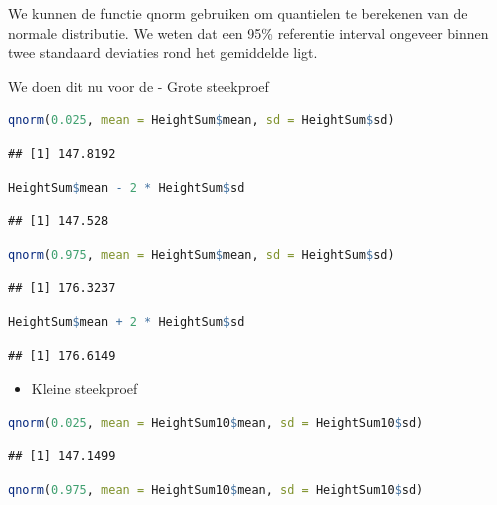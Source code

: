 \documentclass[
  12pt,dutch,coursenotes]{book}
\providecommand{\tightlist}{%
  \setlength{\itemsep}{0pt}\setlength{\parskip}{0pt}}
\theoremstyle{definition}
\theoremstyle{definition}
\theoremstyle{definition}
\theoremstyle{definition}
\theoremstyle{remark}
\begin{document}
We kunnen de functie qnorm gebruiken om quantielen te berekenen van de normale distributie. We weten dat een 95\% referentie interval ongeveer binnen twee standaard deviaties rond het gemiddelde ligt.

We doen dit nu voor de
- Grote steekproef

\begin{lstlisting}[language=R]
qnorm(0.025, mean = HeightSum$mean, sd = HeightSum$sd)
\end{lstlisting}

\begin{lstlisting}
## [1] 147.8192
\end{lstlisting}

\begin{lstlisting}[language=R]
HeightSum$mean - 2 * HeightSum$sd
\end{lstlisting}

\begin{lstlisting}
## [1] 147.528
\end{lstlisting}

\begin{lstlisting}[language=R]
qnorm(0.975, mean = HeightSum$mean, sd = HeightSum$sd)
\end{lstlisting}

\begin{lstlisting}
## [1] 176.3237
\end{lstlisting}

\begin{lstlisting}[language=R]
HeightSum$mean + 2 * HeightSum$sd
\end{lstlisting}

\begin{lstlisting}
## [1] 176.6149
\end{lstlisting}

\begin{itemize}
\tightlist
\item
  Kleine steekproef
\end{itemize}

\begin{lstlisting}[language=R]
qnorm(0.025, mean = HeightSum10$mean, sd = HeightSum10$sd)
\end{lstlisting}

\begin{lstlisting}
## [1] 147.1499
\end{lstlisting}

\begin{lstlisting}[language=R]
qnorm(0.975, mean = HeightSum10$mean, sd = HeightSum10$sd)
\end{lstlisting}
\end{document}
